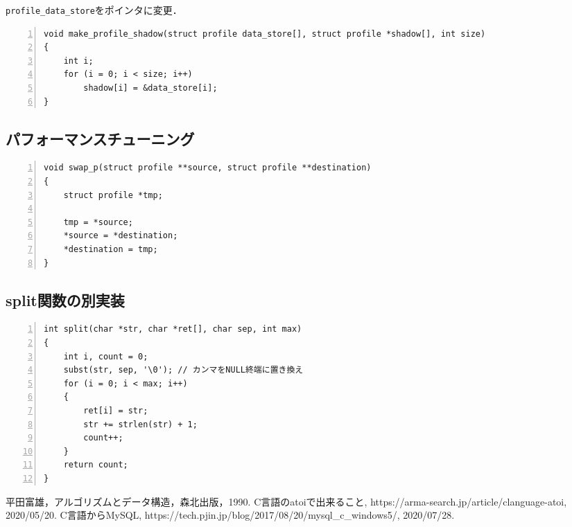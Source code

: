 \documentclass[autodetect-engine,dvi=dvipdfmx,ja=standard,
               a4j,11pt]{bxjsarticle}
\begin{document}
\verb|profile_data_store|をポインタに変更．

\begin{Verbatim}[numbers=left, xleftmargin=10mm, numbersep=6pt,
    fontsize=\small, baselinestretch=0.8]
void make_profile_shadow(struct profile data_store[], struct profile *shadow[], int size)
{
    int i;
    for (i = 0; i < size; i++)
        shadow[i] = &data_store[i];
}

\end{Verbatim}

\subsection{パフォーマンスチューニング} \label{sec:8.3}

\begin{Verbatim}[numbers=left, xleftmargin=10mm, numbersep=6pt,
    fontsize=\small, baselinestretch=0.8]
void swap_p(struct profile **source, struct profile **destination)
{
    struct profile *tmp;

    tmp = *source;
    *source = *destination;
    *destination = tmp;
}

\end{Verbatim}

\subsection{split関数の別実装} \label{sec:8.4}

\begin{Verbatim}[numbers=left, xleftmargin=10mm, numbersep=6pt,
    fontsize=\small, baselinestretch=0.8]
int split(char *str, char *ret[], char sep, int max)
{
    int i, count = 0;
    subst(str, sep, '\0'); // カンマをNULL終端に置き換え
    for (i = 0; i < max; i++)
    {
        ret[i] = str;
        str += strlen(str) + 1;
        count++;
    }
    return count;
}
\end{Verbatim}


\begin{thebibliography}{99}
   平田富雄，アルゴリズムとデータ構造，森北出版，1990.
   C言語のatoiで出来ること, https://arma-search.jp/article/clanguage-atoi, 2020/05/20.
   C言語からMySQL, https://tech.pjin.jp/blog/2017/08/20/mysql\_c\_windows5/, 2020/07/28.
\end{thebibliography}

\end{document}
